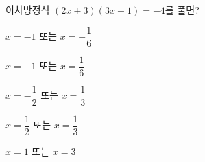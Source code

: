 이차방정식 $(2x+3)(3x-1)=-4$를 풀면?
\begin{choicesii}{\rule[-3ex]{0pt}{8ex}$x=-1$ 또는 $x=-\dfrac{1}{6}$}{\rule[-3ex]{0pt}{8ex}$x=-1$ 또는 $x=\dfrac{1}{6}$}{\rule[-3ex]{0pt}{8ex}$x=-\dfrac{1}{2}$ 또는 $x=\dfrac{1}{3}$}{\rule[-3ex]{0pt}{8ex}$x=\dfrac{1}{2}$ 또는 $x=\dfrac{1}{3}$}{\rule[-3ex]{0pt}{8ex}$x=1$ 또는 $x=3$}\end{choicesii}
